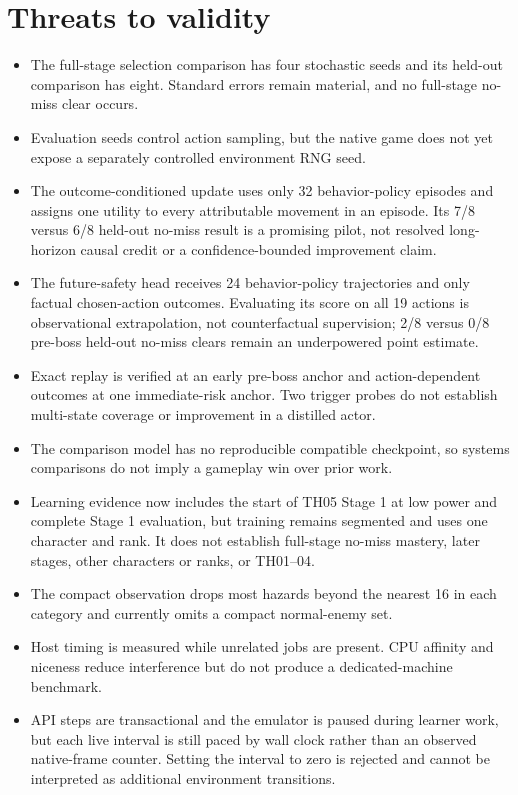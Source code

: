 \documentclass[10pt]{article}
\begin{document}
\section{Threats to validity}

\begin{itemize}
  \item The full-stage selection comparison has four stochastic seeds and its
  held-out comparison has eight.  Standard errors remain material, and no
  full-stage no-miss clear occurs.
  \item Evaluation seeds control action sampling, but the native game does not
  yet expose a separately controlled environment RNG seed.
  \item The outcome-conditioned update uses only 32 behavior-policy episodes
  and assigns one utility to every attributable movement in an episode.  Its
  7/8 versus 6/8 held-out no-miss result is a promising pilot, not resolved
  long-horizon causal credit or a confidence-bounded improvement claim.
  \item The future-safety head receives 24 behavior-policy trajectories and
  only factual chosen-action outcomes.  Evaluating its score on all 19 actions
  is observational extrapolation, not counterfactual supervision; 2/8 versus
  0/8 pre-boss held-out no-miss clears remain an underpowered point estimate.
  \item Exact replay is verified at an early pre-boss anchor and
  action-dependent outcomes at one immediate-risk anchor.  Two trigger probes
  do not establish multi-state coverage or improvement in a distilled actor.
  \item The comparison model has no reproducible compatible checkpoint, so
  systems comparisons do not imply a gameplay win over prior work.
  \item Learning evidence now includes the start of TH05 Stage 1 at low power
  and complete Stage 1 evaluation, but training remains segmented and uses one
  character and rank.  It does not establish full-stage no-miss mastery, later
  stages, other characters or ranks, or TH01--04.
  \item The compact observation drops most hazards beyond the nearest 16 in
  each category and currently omits a compact normal-enemy set.
  \item Host timing is measured while unrelated jobs are present.  CPU affinity
  and niceness reduce interference but do not produce a dedicated-machine
  benchmark.
  \item API steps are transactional and the emulator is paused during learner
  work, but each live interval is still paced by wall clock rather than an
  observed native-frame counter.  Setting the interval to zero is rejected and
  cannot be interpreted as additional environment transitions.
\end{itemize}
\end{document}
